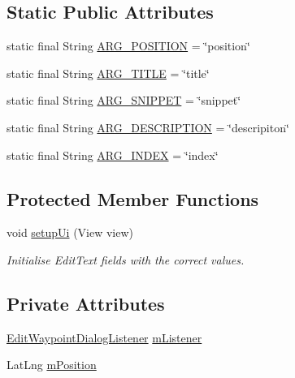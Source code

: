 \subsection*{Static Public Attributes}
\begin{DoxyCompactItemize}
\item 
static final String \hyperlink{classuk_1_1ac_1_1swan_1_1digitaltrails_1_1fragments_1_1_edit_waypoint_dialog_fragment_af004a9b56cf7513f4ecb79c963ebc353}{A\+R\+G\+\_\+\+P\+O\+S\+I\+T\+I\+O\+N} = \char`\"{}position\char`\"{}
\item 
static final String \hyperlink{classuk_1_1ac_1_1swan_1_1digitaltrails_1_1fragments_1_1_edit_waypoint_dialog_fragment_aad3e47036a77df27ad107a61bffcad9b}{A\+R\+G\+\_\+\+T\+I\+T\+L\+E} = \char`\"{}title\char`\"{}
\item 
static final String \hyperlink{classuk_1_1ac_1_1swan_1_1digitaltrails_1_1fragments_1_1_edit_waypoint_dialog_fragment_ae7ecba4d3ab78b83586ed83720458d80}{A\+R\+G\+\_\+\+S\+N\+I\+P\+P\+E\+T} = \char`\"{}snippet\char`\"{}
\item 
static final String \hyperlink{classuk_1_1ac_1_1swan_1_1digitaltrails_1_1fragments_1_1_edit_waypoint_dialog_fragment_ad587605871836c32d04d09b650dddfe1}{A\+R\+G\+\_\+\+D\+E\+S\+C\+R\+I\+P\+T\+I\+O\+N} = \char`\"{}descripiton\char`\"{}
\item 
static final String \hyperlink{classuk_1_1ac_1_1swan_1_1digitaltrails_1_1fragments_1_1_edit_waypoint_dialog_fragment_ab7288eeb66159edbdbd02f67d4eca154}{A\+R\+G\+\_\+\+I\+N\+D\+E\+X} = \char`\"{}index\char`\"{}
\end{DoxyCompactItemize}
\subsection*{Protected Member Functions}
\begin{DoxyCompactItemize}
\item 
void \hyperlink{classuk_1_1ac_1_1swan_1_1digitaltrails_1_1fragments_1_1_edit_waypoint_dialog_fragment_ada4d70217eaebd633c3e15fa620d1512}{setup\+Ui} (View view)
\begin{DoxyCompactList}\small\item\em Initialise Edit\+Text fields with the correct values. \end{DoxyCompactList}\end{DoxyCompactItemize}
\subsection*{Private Attributes}
\begin{DoxyCompactItemize}
\item 
\hyperlink{interfaceuk_1_1ac_1_1swan_1_1digitaltrails_1_1fragments_1_1_edit_waypoint_dialog_fragment_1_1_edit_waypoint_dialog_listener}{Edit\+Waypoint\+Dialog\+Listener} \hyperlink{classuk_1_1ac_1_1swan_1_1digitaltrails_1_1fragments_1_1_edit_waypoint_dialog_fragment_a8c5aa7c38805928e636cfc0e0bbe2a85}{m\+Listener}
\item 
Lat\+Lng \hyperlink{classuk_1_1ac_1_1swan_1_1digitaltrails_1_1fragments_1_1_edit_waypoint_dialog_fragment_acfed39d12a3f0c7dfcbf7b37aed2e936}{m\+Position}
\end{DoxyCompactItemize}
